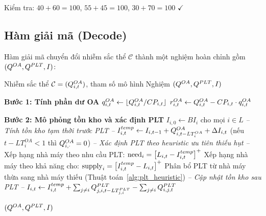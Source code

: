 Kiểm tra: $40+60=100$, $55+45=100$, $30+70=100$ $\checkmark$

\subsection{Hàm giải mã (Decode)}

\label{subsec:decode}

Hàm giải mã chuyển đổi nhiễm sắc thể $\mathcal{C}$ thành một nghiệm hoàn chỉnh gồm $(Q^{OA}, Q^{PLT}, I)$:

\begin{algorithm}[H]
\caption{Giải mã nhiễm sắc thể (Decode)}
\begin{algorithmic}[1]
\Require Nhiễm sắc thể $\mathcal{C} = (Q^{OA}_{i,t})$, tham số mô hình
\Ensure Nghiệm $(Q^{OA}, Q^{PLT}, I)$

\State \textbf{Bước 1: Tính phần dư OA}
  \State $q^{OA}_{i,t} \gets \lfloor Q^{OA}_{i,t} / CP_{i,t} \rfloor$
  \State $r^{OA}_{i,t} \gets Q^{OA}_{i,t} - CP_{i,t} \cdot q^{OA}_{i,t}$
\EndFor

\State \textbf{Bước 2: Mô phỏng tồn kho và xác định PLT}
\State $I_{i,0} \gets BI_i$ \quad cho mọi $i \in L$
  \State \textit{-- Tính tồn kho tạm thời trước PLT --}
  \State $I^{temp}_{i,t} \gets I_{i,t-1} + Q^{OA}_{i,t - LT_i^{OA}} + \Delta I_{i,t}$
  \quad (nếu $t - LT_i^{OA} < 1$ thì $Q^{OA}_{i,\cdot} = 0$)
  \State \textit{-- Xác định PLT theo heuristic ưu tiên thiếu hụt --}
    \State Xếp hạng nhà máy theo nhu cầu PLT: $\text{need}_i = \left[L_{i,t} - I^{temp}_{i,t}\right]^+$
    \State Xếp hạng nhà máy theo khả năng cho: $\text{supply}_i = \left[I^{temp}_{i,t} - L_{i,t}\right]^+$
    \State Phân bổ PLT từ nhà máy thừa sang nhà máy thiếu (Thuật toán~\ref{alg:plt_heuristic})
  \EndIf
  \State \textit{-- Cập nhật tồn kho sau PLT --}
  \State $I_{i,t} \gets I^{temp}_{i,t} + \sum_{j \neq i} Q^{PLT}_{j,i,t-LT_{j,i}^{PLT}} - \sum_{j \neq i} Q^{PLT}_{i,j,t}$
\EndFor

\State \Return $(Q^{OA}, Q^{PLT}, I)$
\end{algorithmic}
\end{algorithm}


